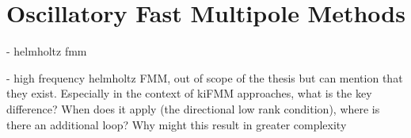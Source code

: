
\section{Oscillatory Fast Multipole Methods}\label{chpt:fmm:sec:oscillatory}


- helmholtz fmm

- high frequency helmholtz FMM, out of scope of the thesis but can mention that they exist. Especially in the context of kiFMM approaches, what is the key difference? When does it apply (the directional low rank condition), where is there an additional loop? Why might this result in greater complexity
